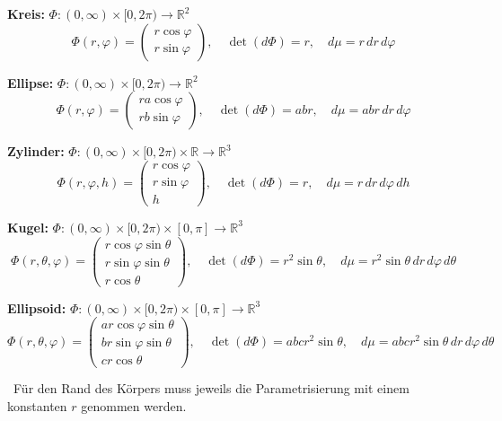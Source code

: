 \textbf{Kreis:} $\Phi : (0, \infty) \times [0, 2\pi) \to \mathbb{R}^2$
\[
\Phi(r, \varphi) = \begin{pmatrix} r\cos\varphi \\ r\sin\varphi \end{pmatrix}, \quad
\det(d\Phi) = r, \quad
d\mu = r\,dr\,d\varphi
\]

\textbf{Ellipse:} $\Phi : (0, \infty) \times [0, 2\pi) \to \mathbb{R}^2$
\[
\Phi(r, \varphi) = \begin{pmatrix} ra\cos\varphi \\ rb\sin\varphi \end{pmatrix}, \quad
\det(d\Phi) = abr, \quad
d\mu = abr\,dr\,d\varphi
\]

\textbf{Zylinder:} $\Phi : (0, \infty) \times [0, 2\pi) \times \mathbb{R} \to \mathbb{R}^3$
\[
\Phi(r, \varphi, h) = \begin{pmatrix} r\cos\varphi \\ r\sin\varphi \\ h \end{pmatrix}, \quad
\det(d\Phi) = r, \quad
d\mu = r\,dr\,d\varphi\,dh
\]

\textbf{Kugel:} $\Phi : (0, \infty) \times [0, 2\pi) \times [0, \pi] \to \mathbb{R}^3$
\[
\Phi(r, \theta, \varphi) =
\begin{pmatrix}
r\cos\varphi\sin\theta \\
r\sin\varphi\sin\theta \\
r\cos\theta
\end{pmatrix}, \quad
\det(d\Phi) = r^2\sin\theta, \quad
d\mu = r^2\sin\theta\,dr\,d\varphi\,d\theta
\]

\textbf{Ellipsoid:} $\Phi : (0, \infty) \times [0, 2\pi) \times [0, \pi] \to \mathbb{R}^3$
\[
\Phi(r, \theta, \varphi) =
\begin{pmatrix}
ar\cos\varphi\sin\theta \\
br\sin\varphi\sin\theta \\
cr\cos\theta
\end{pmatrix}, \quad
\det(d\Phi) = abcr^2\sin\theta, \quad
d\mu = abcr^2\sin\theta\,dr\,d\varphi\,d\theta
\]

\vspace{1em}
\noindent
{\textbullet\ Für den Rand des Körpers muss jeweils die Parametrisierung mit einem konstanten \( r \) genommen werden.}



